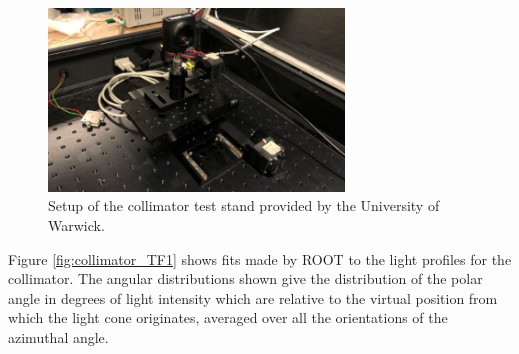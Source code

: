 \begin{figure}
    \centering
    \includegraphics[width=0.7\textwidth]{Figures/coll_test_stand.png}
    \caption{Setup of the collimator test stand provided by the University of Warwick.}
    \label{fig:coll_test_stand}
\end{figure}

Figure \ref{fig:collimator_TF1} shows fits made by ROOT to the light profiles for the collimator. The angular distributions shown give the distribution of the polar angle in degrees of light intensity which are relative to the virtual position from which the light cone originates, averaged over all the orientations of the azimuthal angle. 

